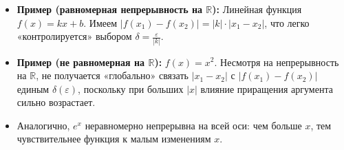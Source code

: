 \begin{customexample}
	\begin{itemize}
		\item \textbf{Пример (равномерная непрерывность на $\mathbb{R}$):}
		      Линейная функция $f(x)=kx + b$. Имеем
		      $|f(x_1)-f(x_2)|=|k|\cdot|x_1-x_2|$, что легко «контролируется»
		      выбором $\delta=\tfrac{\varepsilon}{|k|}$.
		\item \textbf{Пример (не равномерная на $\mathbb{R}$):}
		      $f(x)=x^2$. Несмотря на непрерывность на $\mathbb{R}$, не получается
		      «глобально» связать $|x_1-x_2|$ с $|f(x_1)-f(x_2)|$ единым $\delta(\varepsilon)$,
		      поскольку при больших $|x|$ влияние приращения аргумента сильно возрастает.
		\item Аналогично, $e^x$ неравномерно непрерывна на всей оси: чем больше $x$,
		      тем чувствительнее функция к малым изменениям $x$.
	\end{itemize}
\end{customexample}
